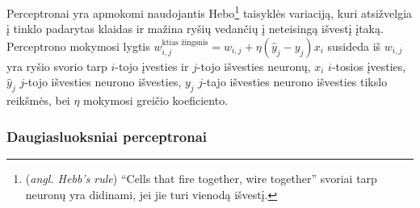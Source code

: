 \documentclass{VUMIFPSbakalaurinis}
\begin{document}
{	Perceptronai yra apmokomi naudojantis Hebo\footnote{(\textit{angl. Hebb's rule}) \enquote{Cells that fire together, wire together} svoriai tarp neuronų yra didinami, jei jie turi vienodą išvestį.} taisyklės variaciją, kuri atsižvelgia į tinklo padarytas klaidas ir mažina ryšių vedančių į neteisingą išvestį įtaką. Perceptrono mokymosi lygtis \(w_{i, j}^{\textrm{ktias žingsnis}} = w_{i, j} + \eta (\hat{y}_j - y_j)x_i\) susideda iš \(w_{i, j}\) yra ryšio svorio tarp \(i\)-tojo įvesties ir \(j\)-tojo išvesties neuronų, \(x_i\) \(i\)-tosios įvesties, \(\hat{y}_j\) \(j\)-tojo išvesties neurono išvesties, \(y_j\) \(j\)-tajo išvesties neurono išvesties tikslo reikšmės, bei \(\eta\) mokymosi greičio koeficiento.\par
}
\subsubsection{Daugiasluoksniai perceptronai}
\end{document}
